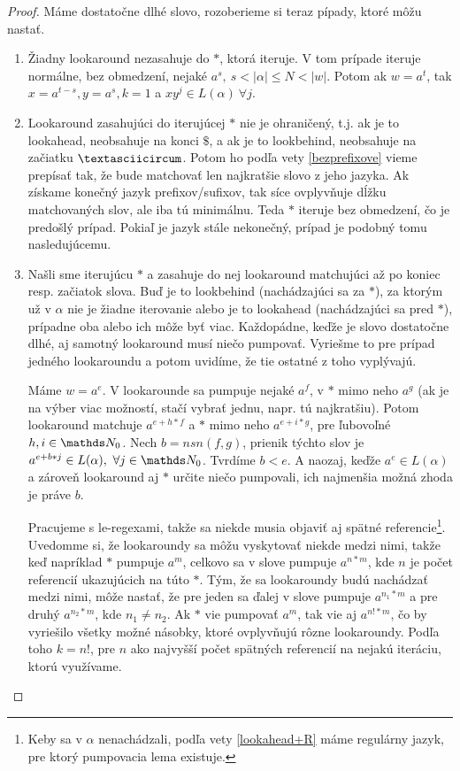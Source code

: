 \begin{proof}
Máme dostatočne dlhé slovo, rozoberieme si teraz pípady, ktoré môžu nastať. 
\begin{enumerate}
\item Žiadny lookaround nezasahuje do $*$, ktorá iteruje. V tom prípade iteruje normálne, bez obmedzení, nejaké $a^s, ~ s<\vert \alpha \vert \leq N < \vert w \vert$. Potom ak $w=a^t$, tak $x=a^{t-s},y=a^s, k=1$ a $xy^j \in L(\alpha) ~ \forall j$. 
\item Lookaround zasahujúci do iterujúcej $*$ nie je ohraničený, t.j. ak je to lookahead, neobsahuje na konci $\mathdollar$, a ak je to lookbehind, neobsahuje na začiatku $\textasciicircum$. Potom ho podľa vety \ref{bezprefixove} vieme prepísať tak, že bude matchovať len najkratšie slovo z jeho jazyka. Ak získame konečný jazyk prefixov/sufixov, tak síce ovplyvňuje dĺžku matchovaných slov, ale iba tú minimálnu. Teda $*$ iteruje bez obmedzení, čo je predošlý prípad. Pokiaľ je jazyk stále nekonečný, prípad je podobný tomu nasledujúcemu.
\item Našli sme iterujúcu $*$ a zasahuje do nej lookaround matchujúci až po koniec resp. začiatok slova. Buď je to lookbehind (nachádzajúci sa za $*$), za ktorým už v $\alpha$ nie je žiadne iterovanie alebo je to lookahead (nachádzajúci sa pred $*$), prípadne oba alebo ich môže byť viac. Každopádne, keďže je slovo dostatočne dlhé, aj samotný lookaround musí niečo pumpovať. Vyriešme to pre prípad jedného lookaroundu a potom uvidíme, že tie ostatné z toho vyplývajú.

Máme $w=a^e$. V lookarounde sa pumpuje nejaké $a^f$, v $*$ mimo neho $a^g$ (ak je na výber viac možností, stačí vybrať jednu, napr. tú najkratšiu). Potom lookaround matchuje $a^{e+h*f}$ a $*$ mimo neho $a^{e+i*g}$, pre ľubovoľné $h,i \in \N_0$. Nech $b = nsn(f,g)$, prienik týchto slov je $a^{e+b*j} \in L(\alpha), ~ \forall j \in \N_0$. Tvrdíme $b<e$. A naozaj, keďže $a^e \in L(\alpha)$ a zároveň lookaround aj $*$ určite niečo pumpovali, ich najmenšia možná zhoda je práve $b$.

Pracujeme s le-regexami, takže sa niekde musia objaviť aj spätné referencie\footnote{Keby sa v $\alpha$ nenachádzali, podľa vety \ref{lookahead+R} máme regulárny jazyk, pre ktorý pumpovacia lema existuje.}. Uvedomme si, že lookaroundy sa môžu vyskytovať niekde medzi nimi, takže keď napríklad $*$ pumpuje $a^m$, celkovo sa v slove pumpuje $a^{n*m}$, kde $n$ je počet referencií ukazujúcich na túto $*$. Tým, že sa lookaroundy budú nachádzať medzi nimi, môže nastať, že pre jeden sa ďalej v slove pumpuje $a^{n_1*m}$ a pre druhý $a^{n_2*m}$, kde $n_1 \neq n_2$. Ak $*$ vie pumpovať $a^m$, tak vie aj $a^{n!*m}$, čo by vyriešilo všetky možné násobky, ktoré ovplyvňujú rôzne lookaroundy. Podľa toho $k = n!$, pre $n$ ako najvyšší počet spätných referencií na nejakú iteráciu, ktorú využívame.


\end{enumerate}
\end{proof}
